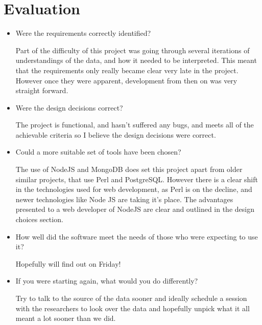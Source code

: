 \chapter{Evaluation}


\begin{itemize}
   \item Were the requirements correctly identified? 

     Part of the difficulty of this project was going through several iterations of understandings of the data, and how it needed to be interpreted. This meant that the requirements only really became clear very late in the project. However once they were apparent, development from then on was very straight forward. 

   \item Were the design decisions correct?

     The project is functional, and hasn't suffered any bugs, and meets all of the achievable criteria so I believe the design decisions were correct.

   \item Could a more suitable set of tools have been chosen?

     The use of NodeJS and MongoDB does set this project apart from older similar projects, that use Perl and PostgreSQL. However there is a clear shift in the technologies used for web development, as Perl is on the decline\cite{needed}, and newer technologies like Node JS are taking it's place. The advantages presented to a web developer of NodeJS are clear and outlined in the design choices section. 

   \item How well did the software meet the needs of those who were expecting to use it?

     Hopefully will find out on Friday!

   \item If you were starting again, what would you do differently?

     Try to talk to the source of the data sooner and ideally schedule a session with the researchers to look over the data and hopefully unpick what it all meant a lot sooner than we did. 
\end{itemize}


